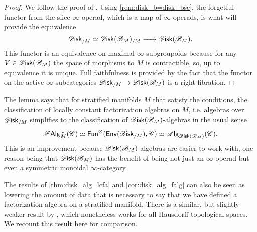 \documentclass[../text]{subfiles}
\begin{document}
\begin{proof}
    We follow the proof of \cite[cor.2.33]{aft_fhstrat}. Using \cref{rem:disk_b=disk_bsc}, the forgetful functor from the slice $\infty$-operad, which is a map of $\infty$-operads, is what will provide the equivalence
    \begin{equation}
        \disk_{/M} \simeq \disk(\bstr_M)_{/M} \xrightarrow{\ \ \ \ } \disk(\bstr_M).
    \end{equation}
    This functor is an equivalence on maximal $\infty$-subgroupoids because for any $V \in \disk(\bstr_M)$ the space of morphisms to $M$ is contractible, so, up to equivalence it is unique. %
    Full faithfulness is provided by the fact that the functor on the active $\infty$-subcategories $\disk_{/M} \xrightarrow{} \disk(\bstr_M)$ is a right fibration. 
\end{proof}

The lemma says that for stratified manifolds $M$ that satisfy the conditions, the classification of locally constant factorization algebras on $M$, i.e. algebras over $\disk_{/M}$ simplifies to the classification of $\disk(\bstr_M)$-algebras in the usual sense
%
\begin{equation}
    \lcfa_M (\catC) \simeq \mathsf{Fun}^\otimes (\mathsf{Env}(\disk_{/M}), \catC) \simeq \alg{\disk(\bstr_M)} (\catC).
\end{equation}
%
This is an improvement because $\disk(\bstr_M)$-algebras are easier to work with, one reason being that $\disk(\bstr_M)$ has the benefit of being not just an $\infty$-operad but even a symmetric monoidal $\infty$-category.

The results of \cref{thm:disk_alg=lcfa} and \cref{cor:disk_alg=falg} can also be seen as lowering the amount of data that is necessary to say that we have defined a factorization algebra on a stratified manifold. There is a similar, but slightly weaker result by \cite{cg2016}, which nonetheless works for all Hausdorff topological spaces. We recount this result here for comparison.
\end{document}
